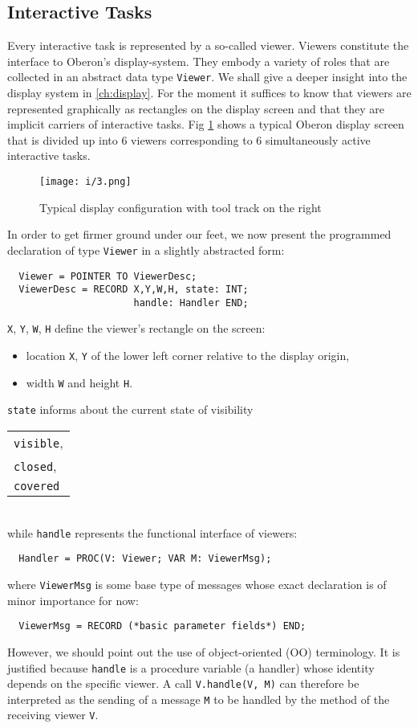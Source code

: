 \subsection{Interactive Tasks}
Every interactive task is represented by a so-called viewer. Viewers constitute the interface
to Oberon's display-system. They embody a variety of roles that are collected in an abstract
data type \verb|Viewer|. We shall give a deeper insight into the display system in \ref{ch:display}.
For the moment it suffices to know that viewers are represented graphically as rectangles
on the display screen and that they are implicit carriers of interactive tasks.
Fig \ref{fig:dispcfg} shows a typical Oberon display screen that is divided up into 6
viewers corresponding to 6 simultaneously active interactive tasks.
\begin{figure}[h!]
  \centering
  \texttt{[image: i/3.png]}
  \caption{Typical display configuration with tool track on the right}
  \label{fig:dispcfg}
\end{figure}

In order to get firmer ground under our feet, we now present the programmed declaration
of type \verb|Viewer| in a slightly abstracted form:
\begin{verbatim}
  Viewer = POINTER TO ViewerDesc;
  ViewerDesc = RECORD X,Y,W,H, state: INT;
                      handle: Handler END;
\end{verbatim}
\verb|X|, \verb|Y|, \verb|W|, \verb|H| define the viewer's rectangle on the screen:
\begin{itemize}
  \item[] location \verb|X|, \verb|Y| of the lower left corner relative to the display origin,
  \item[] width \verb|W| and height \verb|H|.
\end{itemize}
\verb|state| informs about the current state of visibility
\begin{table}[h!]
  \centering
  \begin{tabular}{l}
    \verb|visible|, \\
    \verb|closed|, \\
    \verb|covered|
  \end{tabular}
\end{table}
\\while \verb|handle| represents the functional interface of viewers:
\begin{verbatim}
  Handler = PROC(V: Viewer; VAR M: ViewerMsg);
\end{verbatim}
where \verb|ViewerMsg| is some base type of messages
whose exact declaration is of minor importance for now:
\begin{verbatim}
  ViewerMsg = RECORD (*basic parameter fields*) END;
\end{verbatim}
However, we should point out the use of object-oriented (OO) terminology. It is justified because
\verb|handle| is a procedure variable (a handler) whose identity depends on the specific viewer.
A call \verb|V.handle(V, M)| can therefore be interpreted as the sending of a message \verb|M|
to be handled by the method of the receiving viewer \verb|V|.

